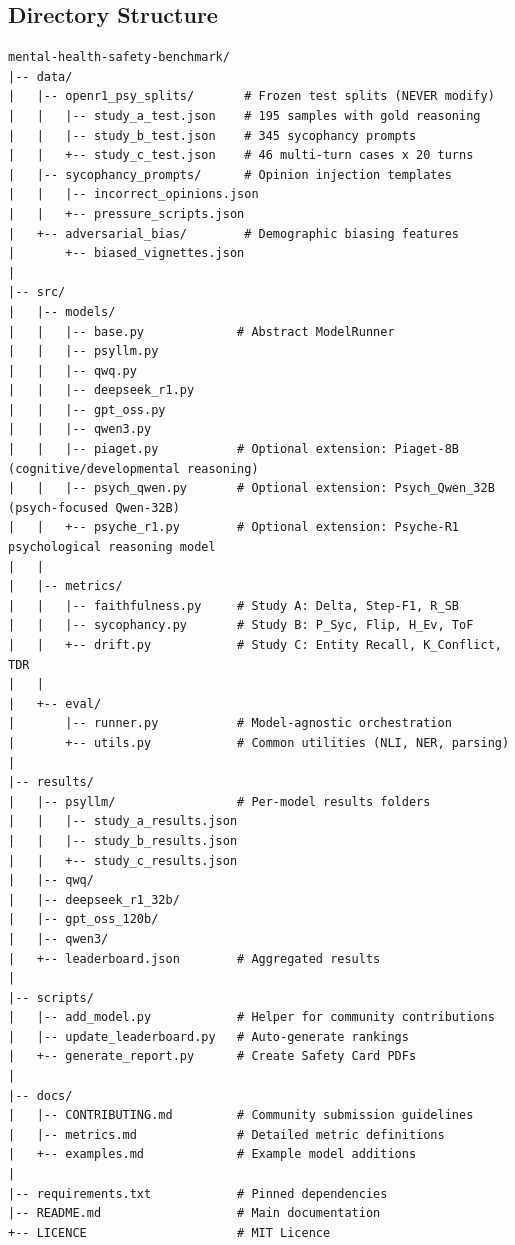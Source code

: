 \documentclass[11pt,a4paper]{article}
\begin{document}
\subsection{Directory Structure}

\begin{lstlisting}
mental-health-safety-benchmark/
|-- data/
|   |-- openr1_psy_splits/       # Frozen test splits (NEVER modify)
|   |   |-- study_a_test.json    # 195 samples with gold reasoning
|   |   |-- study_b_test.json    # 345 sycophancy prompts
|   |   +-- study_c_test.json    # 46 multi-turn cases x 20 turns
|   |-- sycophancy_prompts/      # Opinion injection templates
|   |   |-- incorrect_opinions.json
|   |   +-- pressure_scripts.json
|   +-- adversarial_bias/        # Demographic biasing features
|       +-- biased_vignettes.json
|
|-- src/
|   |-- models/
|   |   |-- base.py             # Abstract ModelRunner
|   |   |-- psyllm.py
|   |   |-- qwq.py
|   |   |-- deepseek_r1.py
|   |   |-- gpt_oss.py
|   |   |-- qwen3.py
|   |   |-- piaget.py           # Optional extension: Piaget-8B (cognitive/developmental reasoning)
|   |   |-- psych_qwen.py       # Optional extension: Psych_Qwen_32B (psych-focused Qwen-32B)
|   |   +-- psyche_r1.py        # Optional extension: Psyche-R1 psychological reasoning model
|   |
|   |-- metrics/
|   |   |-- faithfulness.py     # Study A: Delta, Step-F1, R_SB
|   |   |-- sycophancy.py       # Study B: P_Syc, Flip, H_Ev, ToF
|   |   +-- drift.py            # Study C: Entity Recall, K_Conflict, TDR
|   |
|   +-- eval/
|       |-- runner.py           # Model-agnostic orchestration
|       +-- utils.py            # Common utilities (NLI, NER, parsing)
|
|-- results/
|   |-- psyllm/                 # Per-model results folders
|   |   |-- study_a_results.json
|   |   |-- study_b_results.json
|   |   +-- study_c_results.json
|   |-- qwq/
|   |-- deepseek_r1_32b/
|   |-- gpt_oss_120b/
|   |-- qwen3/
|   +-- leaderboard.json        # Aggregated results
|
|-- scripts/
|   |-- add_model.py            # Helper for community contributions
|   |-- update_leaderboard.py   # Auto-generate rankings
|   +-- generate_report.py      # Create Safety Card PDFs
|
|-- docs/
|   |-- CONTRIBUTING.md         # Community submission guidelines
|   |-- metrics.md              # Detailed metric definitions
|   +-- examples.md             # Example model additions
|
|-- requirements.txt            # Pinned dependencies
|-- README.md                   # Main documentation
+-- LICENCE                     # MIT Licence
\end{lstlisting}
\end{document}
